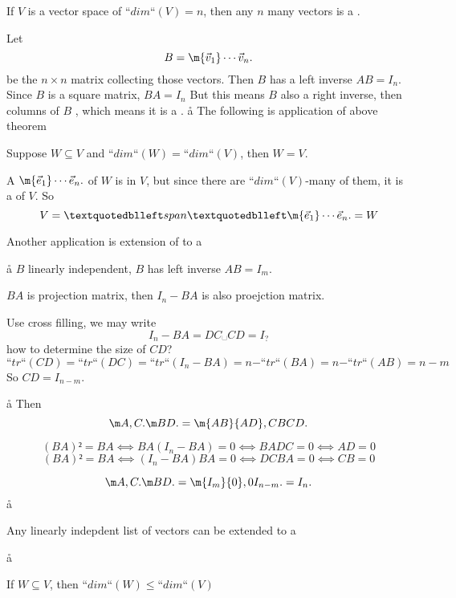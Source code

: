 

\begin{prop}
If $V$ is a vector space of $“dim“(V)=n$, then any $n$ many \li vectors is a \bas.
\end{prop}
Let 
$$B=\m{\vec v_1}\cdots{\vec v_n}.$$
 be the $n × n$ matrix collecting those \li vectors. Then $B$ has a {\color{red}left inverse} $AB=I_n$. Since $B$ is a square matrix, $BA=I_n$
\vfill
But this means $B$ also a {\color{blue}right inverse}, then columns of $B$ \sws, which means it is a \bas. 
\a\aa
The following is application of above theorem
\begin{cor}
Suppose $W ⊆ V$ and $“dim“(W) = “dim“(V)$, then $W=V$.
\end{cor}

A \bas $\m{\vec e_1}\cdots{\vec e_n}.$ of $W$ is \li in $V$, but since there are $“dim“(V)$-many of them, it is a \bas of $V$. So
$$
V = “span“ \m{\vec e_1}\cdots{\vec e_n}. = W
$$

\aaa



Another application is extension of \li to a \bas

\a\aa
$B$ linearly independent, $B$ has left inverse $AB = I_m$.

$BA$ is projection matrix, then $I_n-BA$ is also proejction matrix.

Use cross filling, we may write 
$$
I_n-BA = DC ␣  CD = I_?
$$
how to determine the size of $CD$? 
$$
“tr“(CD) = “tr“(DC) = “tr“(I_n-BA)=n-“tr“(BA)=n-“tr“(AB)= n-m
$$
So $CD = I_{n-m}$.

\a\aa
Then 
$$
\m A,C.\m BD.  = \m{AB}{AD},{CB}{CD}.
$$


$$(BA)²=BA ⟺   BA(I_n-BA)=0 ⟺  BADC = 0 ⟺   AD = 0 $$
$$(BA)²=BA ⟺  (I_n-BA)BA=0 ⟺  DCBA = 0 ⟺   CB = 0 $$


$$
\m A,C.\m BD.  = \m{I_m}{0},{0}{I_{n-m}}. = I_n.
$$
\a\aa

\begin{prop}
Any linearly indepdent list of vectors can be extended to a \bas
\end{prop}

\a\aa
\begin{prop}
If $W ⊆ V$, then $“dim“(W) ≤ “dim“(V)$
\end{prop}
\aaa

